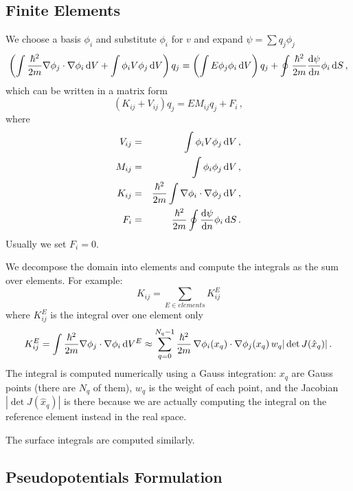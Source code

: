 \subsection{Finite Elements}

We choose a basis $\phi_i$ and substitute $\phi_i$ for $v$ and expand $\psi=\sum q_j\phi_j$
\begin{equation}
  \left(\int{\hbar^2\over2m}\nabla\phi_j\cdot\nabla\phi_i\,{\rm d} V+ \int\phi_iV\phi_j\,{\rm d} V\right)q_j = \left(\int E\phi_j\phi_i\,{\rm d} V\right)q_j +\oint{\hbar^2\over2m}{{\rm d}\psi\over{\rm d}n}\phi_i\,{\rm d} S\,,  \label{fem}
\end{equation}
which can be written in a matrix form 
\begin{equation*}
  \left(K_{ij}+V_{ij}\right)q_j=EM_{ij}q_j+F_i\,,
\end{equation*}
where 
\begin{eqnarray*}
V_{ij}&=&\int\phi_iV\phi_j\,{\rm d} V\,, \\
M_{ij}&=&\int\phi_i\phi_j\,{\rm d} V\,, \\
K_{ij}&=&{\hbar^2\over2m}\int\nabla\phi_i\cdot\nabla\phi_j\,{\rm d} V\,, \\
F_i&=&{\hbar^2\over2m}\oint{{\rm d}\psi\over{\rm d}n}\phi_i\,{\rm d} S\,. \\
\end{eqnarray*}
 Usually we set $F_i=0$.

We decompose the domain into elements and compute the integrals as the sum over elements. For example: 
\begin{equation*}
  K_{ij}=\sum_{E\in elements} K_{ij}^E
\end{equation*}
where $K_{ij}^E$ is the integral over one element only 
\begin{equation*}
  K_{ij}^{E}=\int{\hbar^2\over2m}\nabla\phi_j\cdot\nabla\phi_i\,{\rm d} V^{E}\approx \sum_{q=0}^{N_q-1}{\hbar^2\over2m}\,\nabla\phi_i(x_q)\cdot\nabla\phi_j(x_q)\, w_q|\det J(\hat x_q)|\,.
\end{equation*}
The integral is computed numerically using a Gauss integration: $x_q$ are Gauss points (there are $N_q$ of them), $w_q$ is the weight of each point, and the Jacobian $|\det J(\hat x_q)|$ is there because we are actually computing the integral on the reference element instead in the real space.

The surface integrals are computed similarly.

\subsection{Pseudopotentials Formulation}


